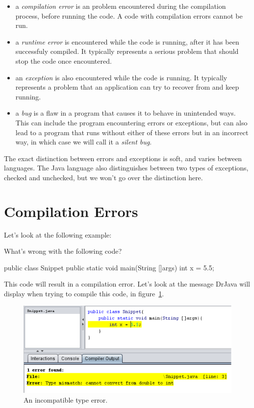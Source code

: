 \begin{definition}
\leavevmode\newline
\begin{itemize}
    \item a \emph{compilation error} is an problem encountered during the compilation process, before running the code. A code with compilation errors cannot be run.
    \item a \emph{runtime error} is encountered while the code is running, after it has been successfuly compiled. It typically represents a serious problem that should stop the code once encountered.
    \item an \emph{exception} is also encountered while the code is running. It typically represents a problem that an application can try to recover from and keep running.
    \item a \emph{bug} is a flaw in a program that causes it to behave in unintended ways. This can include the program encountering errors or exceptions, but can also lead to a program that runs without either of these errors but in an incorrect way, in which case we will call it a \emph{silent bug}.
\end{itemize}
\end{definition}

The exact distinction between errors and exceptions is soft, and varies between languages. The Java language also distinguishes between two types of exceptions, checked and unchecked, but we won't go over the distinction here.

\section{Compilation Errors}

Let's look at the following example:

\begin{example}
What's wrong with the following code?

\begin{code}
public class Snippet{
    public static void main(String []args){
        int x = 5.5;
    }
}
\end{code}
\end{example}

This code will result in a compilation error. Let's look at the message DrJava will display when trying to compile this code, in figure~\ref{fig:type_mismatch}.

\begin{figure}[h!]
\centering
\includegraphics[scale=0.8]{lectures/images/incompatible_types.PNG}
\caption{An incompatible type error.}
\label{fig:type_mismatch}
\end{figure}

